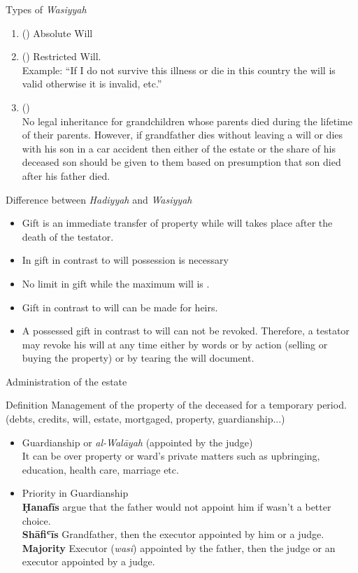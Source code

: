 \begin{frame}{Types of \textit{Wasiyyah}}
\begin{enumerate}
\item () Absolute Will
\item () Restricted Will.\\
Example: “If I do not survive this illness or die in this country the will is valid otherwise it is invalid, etc.”
\item ()\\
No legal inheritance for grandchildren whose parents died during the lifetime of their parents. However, if grandfather dies without leaving a will or dies with his son in a car accident then either  of the estate or the share of his deceased son should be given to them based on presumption that son died after his father died.
\end{enumerate}
\end{frame}

\begin{frame}{Difference between \textit{Hadiyyah} and \textit{Wasiyyah}}
\begin{itemize}
\item Gift is an immediate transfer of property while will takes place after the death of the testator.
\item In gift in contrast to will possession is necessary
\item No limit in gift while the maximum will is .
\item Gift in contrast to will can be made for heirs.
\item A possessed gift in contrast to will can not be revoked. Therefore, a testator may revoke his will at any time either by words or by action (selling or buying the property) or by tearing the will document.
\end{itemize}
\end{frame}

\begin{frame}{Administration of the estate}
\begin{block}{Definition}
Management of the property of the deceased for a temporary period. (debts, credits, will, estate, mortgaged, property, guardianship...)
\end{block}
\begin{itemize}
\item Guardianship or \textit{al-Walāyah} (appointed by the judge)\\
It can be over property or ward’s private matters such as upbringing, education, health care, marriage etc.
\item Priority in Guardianship\\
\textbf{Ḥanafīs} argue that the father would not appoint him if wasn't a better choice.\\
\textbf{Shāfiʿīs} Grandfather, then the executor appointed by him or a judge.\\
\textbf{Majority} Executor (\textit{wasi}) appointed by the father, then the judge or an executor appointed by a judge.
\end{itemize}
\end{frame}

